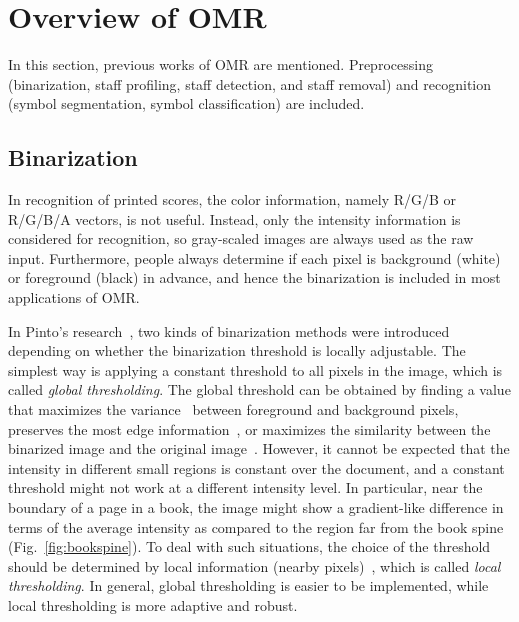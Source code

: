 \chapter{Overview of OMR}
\label{c:overveiw-of-omr}

In this section, previous works of OMR are mentioned. Preprocessing (binarization, staff profiling, staff detection, and staff removal) and recognition (symbol segmentation, symbol classification) are included. 

\section{Binarization}


\graphicspath{{./figsrc/}}
\fi

In recognition of printed scores, the color information, namely R/G/B or R/G/B/A vectors, is not useful. Instead, only the intensity information is considered for recognition, so gray-scaled images are always used as the raw input. Furthermore, people always determine if each pixel is background (white) or foreground (black) in advance, and hence the binarization is included in most applications of OMR.

In Pinto's research~\cite{agri-wiki}, two kinds of binarization methods were introduced depending on whether the binarization threshold is locally adjustable. The simplest way is applying a constant threshold to all pixels in the image, which is called \emph{global thresholding}. The global threshold can be obtained by finding a value that maximizes the variance~\cite{Otsu:1979:ATSMfGLH} between foreground and background pixels, preserves the most edge information~\cite{Chen:2008:ADTIBMboED}, or maximizes the similarity between the binarized image and the original image~\cite{Huang:1995:ITbMtMoF,Tsai:1995:AFTSPfMaUH}. However, it cannot be expected that the intensity in different small regions is constant over the document, and a constant threshold might not work at a different intensity level. In particular, near the boundary of a page in a book, the image might show a gradient-like difference in terms of the average intensity as compared to the region far from the book spine (Fig.~\ref{fig:bookspine}). To deal with such situations, the choice of the threshold should be determined by local information (nearby pixels)~\cite{Bernsen:2005:DToGLI}, which is called \emph{local thresholding}. In general, global thresholding is easier to be implemented, while local thresholding is more adaptive and robust.

